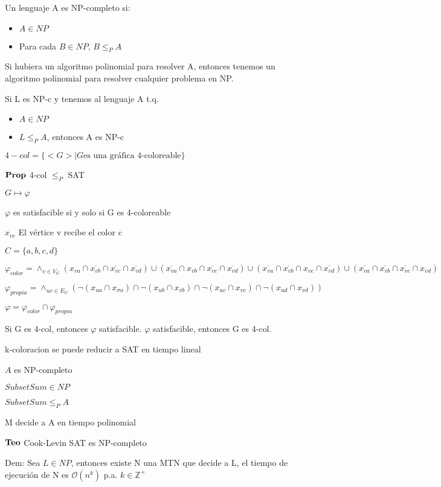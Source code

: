 \documentclass{homework}
\begin{document}
Un lenguaje A es NP-completo si:
\begin{itemize}
\item $A \in NP$
\item Para cada $B \in NP$, $B \leq_P A$
\end{itemize}

Si hubiera un algoritmo polinomial para resolver A, entonces tenemos un algoritmo polinomial para resolver cualquier problema en NP.

Si L es NP-c y tenemos al lenguaje A t.q. 
\begin{itemize}
	\item $A \in NP$
	\item $L \leq_P A$, entonces A es NP-c
\end{itemize}

$4-col = \{<G> | G \text{es una gráfica 4-coloreable} \}$

$\bf{Prop}$ 4-col $\leq_P$ SAT

$G \mapsto \varphi$

$\varphi$ es satisfacible si y solo si G es 4-coloreable

$x_{v c}$ El vértice v recibe el color c

$C = \{a,b,c,d\}$

$\varphi_{color} = \wedge_{v \in V_G}
(x_{v a} \cap \overline{x_{v b}} \cap \overline{x_{v c}} \cap \overline{x_{v d}}) \cup
(\overline{x_{v a}} \cap x_{v b} \cap \overline{x_{v c}} \cap \overline{x_{v d}}) \cup
(\overline{x_{v a}} \cap \overline{x_{v b}} \cap x_{v c} \cap \overline{x_{v d}}) \cup
(\overline{x_{v a}} \cap \overline{x_{v b}} \cap \overline{x_{v c}} \cap x_{v d})$

$\varphi_{propia} = \wedge_{uv \in E_G}(\neg(x_{u a} \cap x_{\sigma a}) \cap
\neg(x_{u b} \cap x_{v b}) \cap
\neg(x_{u c} \cap x_{v c}) \cap
\neg(x_{u d} \cap x_{v d}))$

$\varphi = \varphi_{color} \cap \varphi_{propia}$

Si G es 4-col, entonces $\varphi$ satisfacible.
$\varphi$ satisfacible, entonces G es 4-col.

k-coloracion se puede reducir a SAT en tiempo lineal

$A$ es NP-completo

$SubsetSum \in NP$

$SubsetSum \leq_P A$

M decide a A en tiempo polinomial

$\bf{Teo}$ Cook-Levin SAT es NP-completo

Dem: Sea $L \in NP$, entonces existe N una MTN que decide a L, el tiempo de ejecución de N es $\mathcal{O}(n^k)$ p.a. $k \in \mathds{Z}^+$
\end{document}
